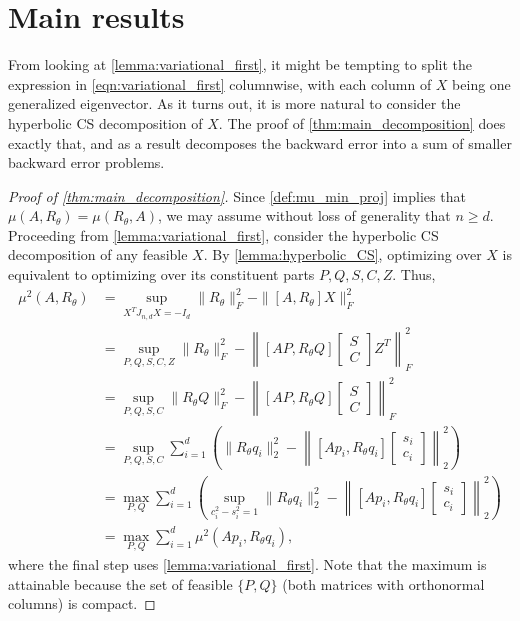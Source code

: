 \documentclass{article}
\newcommand{\ts}{^T}
\begin{document}
\section{Main results} \label{sec:main_results}
From looking at \cref{lemma:variational_first}, it might be tempting to split the expression in \cref{eqn:variational_first} columnwise, with each column of $X$ being one generalized eigenvector. As it turns out, it is more natural to consider the hyperbolic CS decomposition of $X$. The proof of \cref{thm:main_decomposition} does exactly that, and as a result decomposes the backward error into a sum of smaller backward error problems. 

\begin{proof}[Proof of \cref{thm:main_decomposition}]
     Since \cref{def:mu_min_proj} implies that $\mu(A,R_\theta) = \mu(R_\theta, A)$, we may assume without loss of generality that $n\geq d$. Proceeding from \cref{lemma:variational_first}, consider the hyperbolic CS decomposition of any feasible $X$. By \cref{lemma:hyperbolic_CS}, optimizing over $X$ is equivalent to optimizing over its constituent parts $P, Q, S, C, Z$. Thus, 
    \begin{align*}
        \mu^2(A,R_\theta) &= \sup_{X\ts J_{n,d}X=-I_d}\|R_\theta\|_F^2 - \|[A,R_\theta]X\|_F^2 \\
        &= \sup_{P,Q,S,C,Z} \|R_\theta\|_F^2 - \left\|[AP,R_\theta Q]\begin{bmatrix}S\\C\end{bmatrix}Z\ts\right\|_F^2 \\
        &= \sup_{P,Q,S,C} \|R_\theta Q\|_F^2 - \left\|[AP,R_\theta Q]\begin{bmatrix}S\\C\end{bmatrix}\right\|_F^2 \\
        &= \sup_{P,Q,S,C} \sum_{i=1}^{d}\left(\|R_\theta q_i\|_2^2 - \left\|[Ap_i,R_\theta q_i]\begin{bmatrix}s_i\\c_i\end{bmatrix}\right\|_2^2\right) \\
        &= \max_{P,Q} \sum_{i=1}^{d}\left(\sup_{c_i^2-s_i^2=1}\|R_\theta q_i\|_2^2 - \left\|[Ap_i,R_\theta q_i]\begin{bmatrix}s_i\\c_i\end{bmatrix}\right\|_2^2\right) \\
        &= \max_{P,Q} \sum_{i=1}^d \mu^2(Ap_i, R_\theta q_i),
    \end{align*}
    where the final step uses \cref{lemma:variational_first}. Note that the maximum is attainable because the set of feasible $\{P, Q\}$ (both matrices with orthonormal columns) is compact. 
\end{proof}
\end{document}
